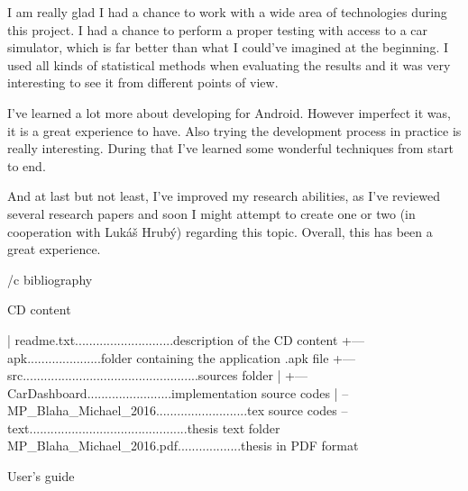 I am really glad I had a chance to work with a wide area of technologies during this project. I had a chance to perform a proper testing with access to a car simulator, which is far better than what I could've imagined at the beginning. I used all kinds of statistical methods when evaluating the results and it was very interesting to see it from different points of view. 

I've learned a lot more about developing for Android. However imperfect it was, it is a great experience to have. Also trying the  development process in practice is really interesting. During that I've learned some wonderful techniques from start to end.

And at last but not least, I've improved my research abilities, as I've reviewed several research papers and soon I might attempt to create one or two (in cooperation with Luk\' a\v s Hrub\' y) regarding this topic. Overall, this has been a great experience.


\bibchap
\usebbl/c bibliography



\app CD content

\begtt
|   readme.txt............................description of the CD content 
+---apk.....................folder containing the application .apk file
+---src..................................................sources folder
|   +---CarDashboard........................implementation source codes
|   \---MP_Blaha_Michael_2016..........................tex source codes
\---text.............................................thesis text folder
        MP_Blaha_Michael_2016.pdf..................thesis in PDF format
\endtt

\app User's guide

